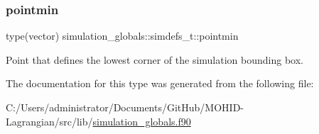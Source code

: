 \mbox{\label{structsimulation__globals_1_1simdefs__t_a76b66c4e9d305de6a0c3b8f1bd2ef319}} 
\subsubsection{\texorpdfstring{pointmin}{pointmin}}
{\footnotesize\ttfamily type(vector) simulation\+\_\+globals\+::simdefs\+\_\+t\+::pointmin\hspace{0.3cm}{\ttfamily [private]}}



Point that defines the lowest corner of the simulation bounding box. 



The documentation for this type was generated from the following file\+:\begin{DoxyCompactItemize}
\item 
C\+:/\+Users/administrator/\+Documents/\+Git\+Hub/\+M\+O\+H\+I\+D-\/\+Lagrangian/src/lib/\mbox{\hyperlink{simulation__globals_8f90}{simulation\+\_\+globals.\+f90}}\end{DoxyCompactItemize}
